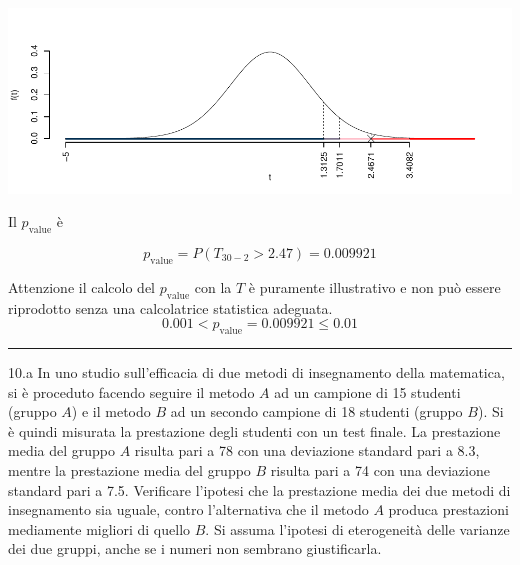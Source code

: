 \documentclass[
  11pt,
]{book}
\theoremstyle{mytheoremstyle}
\theoremstyle{mydefstyle}
\newenvironment{sol}
  {
  \begin{tcolorbox}[enhanced,breakable,arc=0.1mm,boxrule=1pt,colback=white,colframe=iblue,
  title=\bf \fontfamily{lmss}\selectfont \hspace{.5 cm} Soluzione,drop fuzzy shadow]

}{
\end{tcolorbox}
  }
\begin{document}
\begin{sol}
\begin{center}\includegraphics{Esami_passati_con_soluzioni_files/figure-latex/05-test-13,-1} \end{center}

Il \(p_{\text{value}}\) è

\[ p_{\text{value}} = P(T_{30-2}>2.47)=0.009921 \]

Attenzione il calcolo del \(p_\text{value}\) con la \(T\) è puramente illustrativo e non può essere riprodotto senza una calcolatrice statistica adeguata.\[
 0.001 < p_\text{value}= 0.009921 \leq 0.01 
\]

\end{sol}

\begin{center}\rule{0.5\linewidth}{0.5pt}\end{center}

10.a In uno studio sull'efficacia di due metodi di insegnamento della matematica, si è proceduto facendo seguire il metodo \(A\) ad un campione di 15 studenti (gruppo \(A\)) e il metodo \(B\) ad un secondo campione di 18 studenti (gruppo \(B\)). Si è quindi misurata la prestazione degli studenti con un test finale. La prestazione media del gruppo \(A\) risulta pari a 78 con una deviazione standard pari a 8.3, mentre la prestazione media del gruppo \(B\) risulta pari a 74 con una deviazione standard pari a 7.5. Verificare l'ipotesi che la prestazione media dei due metodi di insegnamento sia uguale, contro l'alternativa che il metodo \(A\) produca prestazioni mediamente migliori di quello \(B\). Si assuma l'ipotesi di eterogeneità delle varianze dei due gruppi, anche se i numeri non sembrano giustificarla.
\end{document}
